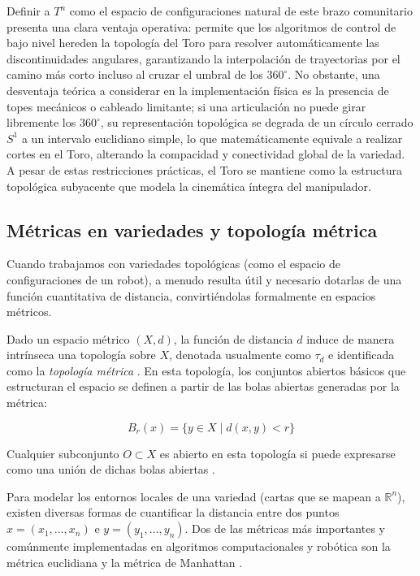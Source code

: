 Definir a $T^n$ 
como el espacio de configuraciones natural de este brazo comunitario presenta una clara ventaja 
operativa: permite que los algoritmos de control de bajo nivel hereden la topología del 
Toro para resolver automáticamente las discontinuidades angulares, garantizando la 
interpolación de trayectorias por el camino más corto incluso al cruzar el umbral de 
los $360^\circ$. No obstante, una desventaja teórica a considerar en la implementación 
física es la presencia de topes mecánicos o cableado limitante; si una articulación no 
puede girar libremente los $360^\circ$, su representación topológica se degrada de un 
círculo cerrado $S^1$ a un intervalo euclidiano simple, lo que matemáticamente equivale a 
realizar cortes en el Toro, alterando la compacidad y conectividad global de la variedad. 
A pesar de estas restricciones prácticas, el Toro se mantiene como la estructura topológica 
subyacente que modela la cinemática íntegra del manipulador.


\subsection{Métricas en variedades y topología métrica}

Cuando trabajamos con variedades topológicas (como el espacio de configuraciones de un robot), 
a menudo resulta útil y necesario dotarlas de una función cuantitativa de distancia, 
convirtiéndolas formalmente en espacios métricos. 

Dado un espacio métrico $(X, d)$, la función de distancia $d$ induce de manera intrínseca una 
topología sobre $X$, denotada usualmente como $\tau_d$ e identificada como la \textit{topología 
métrica} \parencite{antonyan2016topologia}. En esta topología, los conjuntos abiertos básicos 
que estructuran el espacio se 
definen a partir de las bolas abiertas generadas por la métrica:

$$ B_r(x) = \{y \in X \mid d(x,y) < r\} $$

Cualquier subconjunto $O \subset X$ es abierto en esta topología si puede expresarse 
como una unión de dichas bolas abiertas \parencite{waldmann2014topology}.

Para modelar los entornos locales de una variedad (cartas que se mapean a $\mathbb{R}^n$), 
existen diversas formas de cuantificar la distancia entre dos puntos 
$x = (x_1, \dots, x_n)$ e $y = (y_1, \dots, y_n)$. Dos de las métricas más importantes 
y comúnmente implementadas en algoritmos computacionales y robótica son la métrica euclidiana 
y la métrica de Manhattan \parencite{antonyan2016topologia}.

